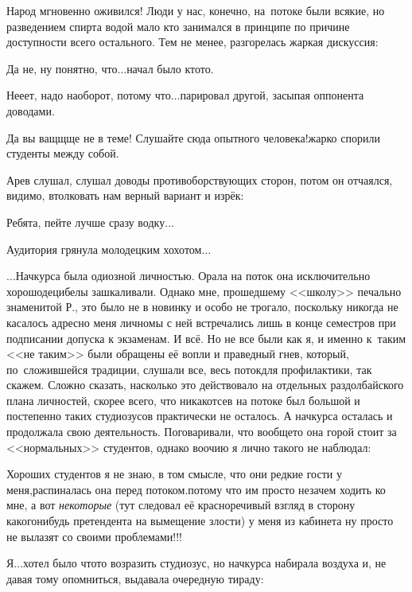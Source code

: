 Народ мгновенно оживился! Люди у нас, конечно, на~потоке были всякие, но разведением спирта водой мало кто занимался в принципе по причине доступности всего остального. Тем не менее, разгорелась жаркая дискуссия:

\diagdash Да не, ну понятно, что$\ldots$\mdash начал было кто\sdash то.

\diagdash Не\sdash е\sdash ет, надо наоборот, потому что$\ldots$\mdash парировал другой, засыпая оппонента доводами.

\diagdash Да вы ващ\sdash щ\sdash ще не в теме! Слушайте сюда опытного человека!\mdash жарко спорили студенты между собой.

Ар\sdash ев слушал, слушал доводы противоборствующих сторон, потом он отчаялся, видимо, втолковать нам верный вариант и изрёк:

\diagdash Ребята, пейте лучше сразу водку$\ldots$

Аудитория грянула молодецким хохотом$\ldots$

\vspace{1.0cm}

$\ldots$Начкурса была одиозной личностью. Орала на поток она исключительно хорошо\mdash децибелы зашкаливали. Однако мне, прошедшему <<школу>> печально знаменитой Р., это было не в новинку и особо не трогало, поскольку никогда не касалось адресно меня лично\mdash мы с ней встречались лишь в конце семестров при подписании допуска к экзаменам. И всё. Но не все были как я, и именно к~таким <<не таким>> были обращены её вопли и праведный гнев, который, по~сложившейся традиции, слушали все, весь поток\mdash для профилактики, так скажем. Сложно сказать, насколько это действовало на отдельных раздолбайского плана личностей, скорее всего, что никак\mdash отсев на потоке был большой и постепенно таких студиозусов практически не осталось. А начкурса осталась и продолжала свою деятельность. Поговаривали, что вообще\sdash то она горой стоит за <<нормальных>> студентов, однако воочию я лично такого не наблюдал:

\diagdash Хороших студентов я не знаю, в том смысле, что они редкие гости у меня,\mdash распиналась она перед потоком.\mdash потому что им просто незачем ходить ко мне, а вот \textit{некоторые} (тут следовал её красноречивый взгляд в сторону какого\sdash нибудь претендента на вымещение злости) у меня из кабинета ну просто не вылазят со своими проблемами!!!

\diagdash Я$\ldots$\mdash хотел было что\sdash то возразить студиозус, но начкурса набирала воздуха и, не давая тому опомниться, выдавала очередную тираду:

